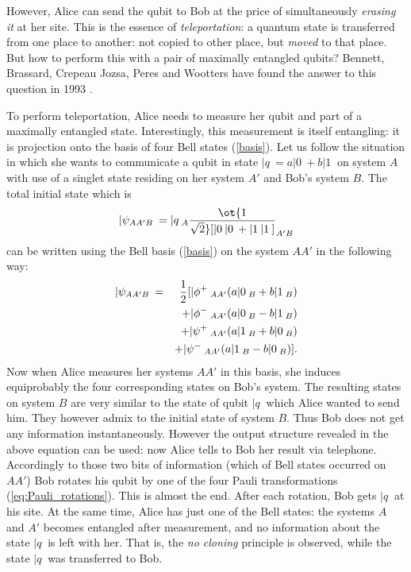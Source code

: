 \documentclass[twocolumn,aps,rmp]{revtex4}
\begin{document}
However, Alice can send the qubit to Bob at the price of
simultaneously {\it erasing it} at her site. This is the essence of
{\it teleportation}: a quantum state is transferred from one place to
another: not copied to other place, but {\it moved} to that place. But
how to perform this with a pair of maximally entangled qubits?
Bennett, Brassard, Crepeau Jozsa, Peres and Wootters have found the
answer to this question in 1993 \cite{Teleportation}.

To perform teleportation, Alice needs to measure her qubit and part of
a maximally entangled state. Interestingly, this measurement is itself
entangling: it is projection onto the basis of four Bell states
(\ref{basis}). Let us follow the situation in which she wants to
communicate a qubit in state $|q\>=a|0\>+b|1\>$ on system $A$ with use
of a singlet state residing on her system $A'$ and Bob's system
$B$. The total initial state which is
\begin{equation}
|\psi_{AA'B}\> =
|q\>_A\ot{1\over \sqrt{2}}[|0\>|0\> + |1\>|1\>]_{A'B}
\end{equation}
can be written using the Bell basis (\ref {basis}) on the system $AA'$
in the following way:
\begin{eqnarray}
  |\psi_{AA'B}\> &=& {1\over 2}[|\phi^+\>_{AA'}(a|0\>_{B} + b|1\>_{B})\nonumber\\
  &&+|\phi^-\>_{AA'}(a|0\>_{B} - b|1\>_{B}) \nonumber \\
  &&+|\psi^+\>_{AA'}(a|1\>_{B} + b|0\>_{B})\nonumber \\
  &&+ |\psi^-\>_{AA'}(a|1\>_{B} - b|0\>_{B})].
\end{eqnarray}
Now when Alice measures her systems $AA'$ in this basis, she induces
equiprobably the four corresponding states on Bob's system. The
resulting states on system $B$ are very similar to the state of qubit
$|q\>$ which Alice wanted to send him. They however admix to the
initial state of system $B$. Thus Bob does not get any information
instantaneously. However the output structure revealed in the above
equation can be used: now Alice tells to Bob her result via
telephone. Accordingly to those two bits of information (which of Bell
states occurred on $AA'$) Bob rotates his qubit by one of the four
Pauli transformations (\ref{eq:Pauli_rotations}).  This is almost the
end. After each rotation, Bob gets $|q\>$ at his site. At the same
time, Alice has just one of the Bell states: the systems $A$ and $A'$
becomes entangled after measurement, and no information about the
state $|q\>$ is left with her. That is, the {\it no cloning} principle
is observed, while the state $|q\>$ was transferred to Bob.
\end{document}
